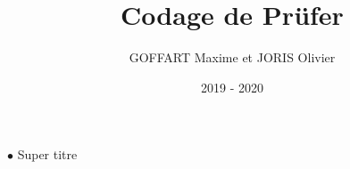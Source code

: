 \documentclass[11pt]{beamer}
\author{GOFFART Maxime et JORIS Olivier}
\title{Codage de Prüfer}
\date{2019 - 2020}
\begin{document}
\begin{frame}
\titlepage
\end{frame}


\begin{frame}{$\bullet$ Super titre}

\end{frame}
\end{document}
